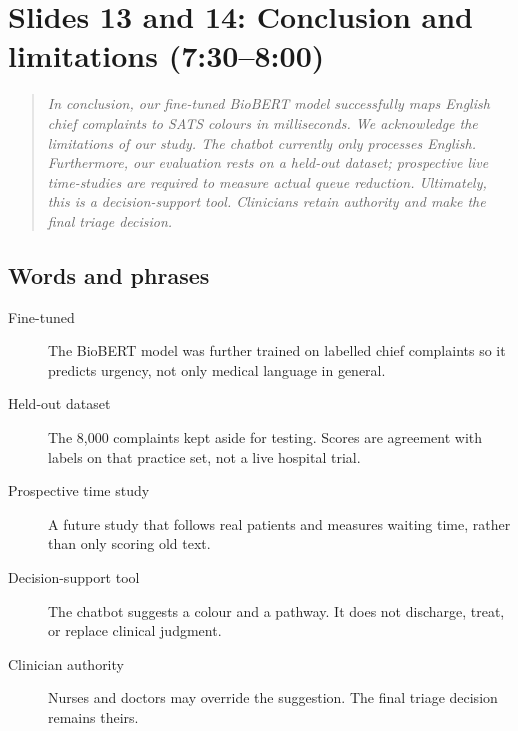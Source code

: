 \documentclass[11pt,a4paper]{article}
\newcommand{\say}[1]{\begin{quote}\itshape #1\end{quote}}
\newcommand{\terms}{\subsection*{Words and phrases}}
\begin{document}
\section{Slides 13 and 14: Conclusion and limitations (7:30--8:00)}

\say{In conclusion, our fine-tuned BioBERT model successfully maps English chief complaints to SATS colours in milliseconds. We acknowledge the limitations of our study. The chatbot currently only processes English. Furthermore, our evaluation rests on a held-out dataset; prospective live time-studies are required to measure actual queue reduction. Ultimately, this is a decision-support tool. Clinicians retain authority and make the final triage decision.}

\terms
\begin{description}
\item[Fine-tuned] The BioBERT model was further trained on labelled chief complaints so it predicts urgency, not only medical language in general.
\item[Held-out dataset] The 8{,}000 complaints kept aside for testing. Scores are agreement with labels on that practice set, not a live hospital trial.
\item[Prospective time study] A future study that follows real patients and measures waiting time, rather than only scoring old text.
\item[Decision-support tool] The chatbot suggests a colour and a pathway. It does not discharge, treat, or replace clinical judgment.
\item[Clinician authority] Nurses and doctors may override the suggestion. The final triage decision remains theirs.
\end{description}
\end{document}
